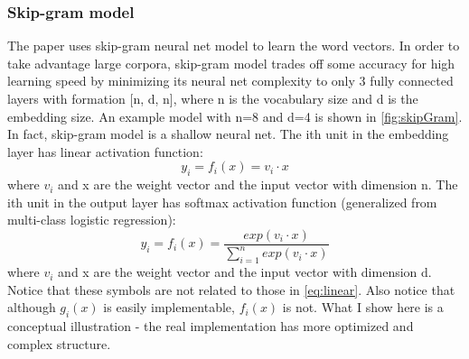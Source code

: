 \documentclass{article}
\begin{document}
\subsubsection{Skip-gram model}
The paper uses skip-gram neural net model to learn the word vectors. In order to take advantage large corpora, skip-gram model trades off some accuracy for high learning speed by minimizing its neural net complexity to only 3 fully connected layers with formation [n, d, n], where n is the vocabulary size and d is the embedding size. An example model with n=8 and d=4 is shown in \autoref{fig:skipGram}. In fact, skip-gram model is a shallow neural net. The ith unit in the embedding layer has linear activation function:
\begin{equation}
	y_i = f_i(x) = v_i \cdot x
	\label{eq:linear}
\end{equation}
where $ v_i $ and x are the weight vector and the input vector with dimension n. The ith unit in the output layer has softmax activation function (generalized from multi-class logistic regression):
\begin{equation}
	y_i = f_i(x) = \frac{exp(v_i \cdot x)}{\sum_{i = 1}^{n}exp(v_i \cdot x)}
\end{equation}
where $ v_i $ and x are the weight vector and the input vector with dimension d. Notice that these symbols are not related to those in \autoref{eq:linear}. Also notice that although $ g_i(x) $ is easily implementable, $ f_i(x) $ is not. What I show here is a conceptual illustration - the real implementation has more optimized and complex structure.
\end{document}
